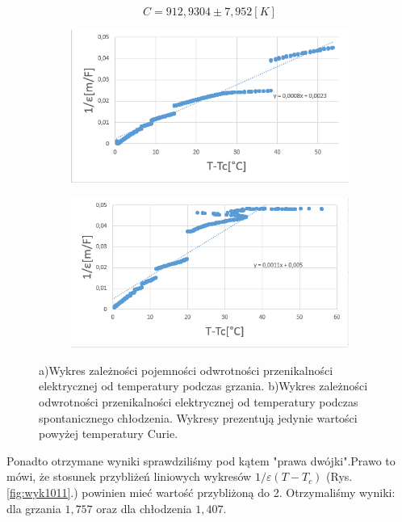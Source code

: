 \documentclass{article}
\begin{document}
\begin{equation}
C=912,9304 \pm 7,952 [K]
\end{equation}

\begin{figure}[h!]
  \centering
  \begin{subfigure}[b]{0.49\linewidth}
    \includegraphics[width=\linewidth]{wyk9.png}
    \caption{}
  \end{subfigure}
  \begin{subfigure}[b]{0.49\linewidth}
    \includegraphics[width=\linewidth]{wyk8.png}
    \caption{}
  \end{subfigure}
  \caption{a)Wykres zależności pojemności odwrotności przenikalności elektrycznej od temperatury podczas grzania. b)Wykres zależności odwrotności przenikalności elektrycznej od temperatury podczas spontanicznego chłodzenia. Wykresy prezentują jedynie wartości powyżej temperatury Curie.}
\label{fig:wyk89}
\end{figure}

Ponadto otrzymane wyniki sprawdziliśmy pod kątem "prawa dwójki".Prawo to mówi, że stosunek przybliżeń liniowych wykresów $1/\varepsilon(T-T_{c})$ (Rys.\ref{fig:wyk1011}.) powinien mieć wartość przybliżoną do 2. Otrzymaliśmy wyniki: dla grzania $1,757$ oraz dla chłodzenia $1,407$.
\end{document}
